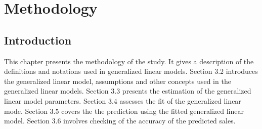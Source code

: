 \chapter{Methodology} 
\label{Chapter3} 
\section{Introduction}
This chapter presents the methodology of the study. It gives a description of the definitions and notations used in generalized linear models. Section 3.2 introduces the generalized linear model, assumptions and other concepts used in the generalized linear models. Section 3.3 presents the estimation of the generalized linear model parameters. Section 3.4 assesses the fit of the generalized linear mode. Section 3.5 covers the the prediction using the fitted generalized linear model. Section 3.6 involves checking of the accuracy of the predicted sales.

